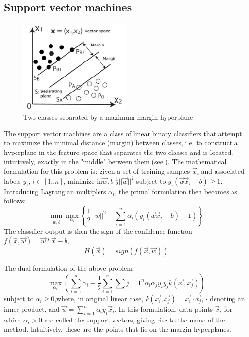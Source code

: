 \subsection{Support vector machines}
\begin{figure}[t]
		\centering
		\includegraphics[width=0.5\textwidth]{margin_sep_lr}
		\caption[Maximum margin separation]{Two classes separated by a maximum margin hyperplane}
		\label{Margin}
	\end{figure}
The support vector machines are a class of linear  binary classifiers that attempt to maximize the minimal distance (margin) between classes, i.e. to construct a hyperplane in the feature space that separates the two classes and is located, intuitively, exactly in the "middle" between them (see ). The mathematical formulation for this problem is: given a set of training samples $\vec{x}_i$ and associated labels $y_i$, $i\in [1..n]$, minimize in$\vec{w},b$ $\frac{1}{2}||\vec{w}||^2$ subject to $y_i(\vec{w}\vec{x}_i-b)\ge 1$. Introducing Lagrangian multiplers $\alpha_i$, the primal formulation then becomes as follows: 
\begin{equation}
\label{simplePrimal}
\min_{\vec{w},b} \max_{\alpha_i}\left\{ \frac{1}{2}||\vec{w}||^2 -\sum_{i=1}^{n}\alpha_i(y_i(\vec{w}\vec{x}_i-b)-1)\right\}
\end{equation}
The classifier output is then the sign of the confidence function $f(\vec{x},\vec{w})=\vec{w}*\vec{x}-b$,
$$
\label{ClassifierOutput}
H(\vec{x})=sign(f(\vec{x},\vec{w}))
$$

The dual formulation of the above problem 
\begin{equation}
\label{simpleDual}
\max_{\alpha_i}\left ( \sum_{i=1}^{n}\alpha_i-\frac{1}{2}\sum_{i=1}^{n}\sum{j=1}^{n}\alpha_i \alpha_j y_i y_j k(\vec{x_i},\vec{x_j})\right)
\end{equation}
subject to $\alpha_i \ge 0$,where, in original linear case, $k(\vec{x_i},\vec{x_j})=\vec{x_i}\cdot \vec{x_j}$, $\cdot$ denoting an inner product, and $\vec{w}=\sum_{i=1}^{n}\alpha_i y_i \vec{x}_i$. In this formulation, data points $\vec{x}_i$ for which $\alpha_i>0$ are called the support vectors, giving rise to the name of the method. Intuitively, these are the points that lie on the margin hyperplanes. 

